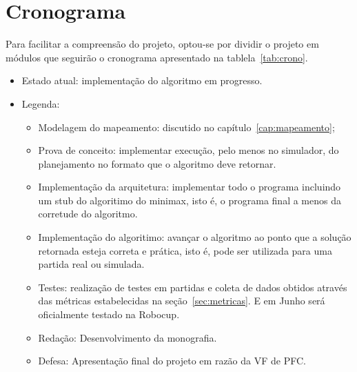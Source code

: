 \chapter{Cronograma}\label{cap:cronograma}

Para facilitar a compreensão do projeto, optou-se por dividir o projeto em módulos
que seguirão o cronograma apresentado na tablela~\ref{tab:crono}.



\begin{itemize}
  \item Estado atual: implementação do algoritmo em progresso.
  \item Legenda:
    \begin{itemize}
      \item Modelagem do mapeamento: discutido no capítulo~\ref{cap:mapeamento};
      \item Prova de conceito: implementar execução, pelo menos no simulador, do
        planejamento no formato que o algoritmo deve retornar.
      \item Implementação da arquitetura: implementar todo o programa incluindo
        um stub do algoritimo do minimax, isto é, o programa final a menos da
        corretude do algoritmo.
      \item Implementação do algoritimo: avançar o algoritmo ao ponto que a
        solução retornada esteja correta e prática, isto é, pode ser utilizada
        para uma partida real ou simulada.
      \item Testes: realização de testes em partidas e coleta de dados obtidos
        através das métricas estabelecidas na seção~\ref{sec:metricas}. E em
        Junho será oficialmente testado na Robocup.
      \item Redação: Desenvolvimento da monografia.
      \item Defesa: Apresentação final do projeto em razão da VF de PFC.
    \end{itemize}
\end{itemize}


